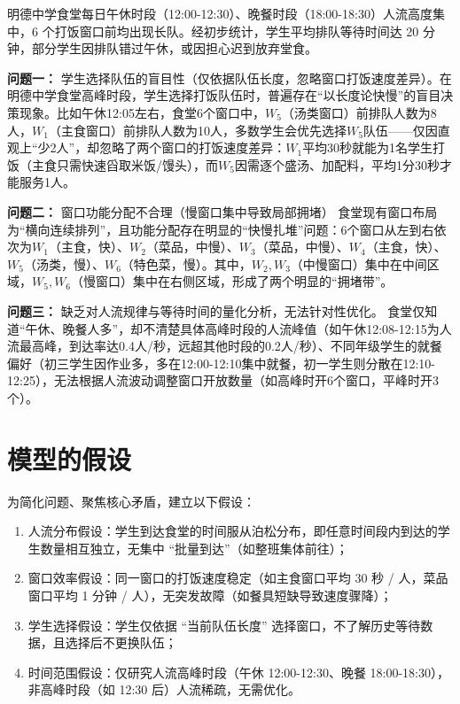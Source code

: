 \documentclass[bwprint]{gmcmthesis}
\begin{document}

\noindent 明德中学食堂每日午休时段（12:00-12:30）、晚餐时段（18:00-18:30）人流高度集中，6 个打饭窗口前均出现长队。经初步统计，学生平均排队等待时间达 20 分钟，部分学生因排队错过午休，或因担心迟到放弃堂食。

\textbf{问题一：} 学生选择队伍的盲目性（仅依据队伍长度，忽略窗口打饭速度差异）。在明德中学食堂高峰时段，学生选择打饭队伍时，普遍存在“以长度论快慢”的盲目决策现象。比如午休12:05左右，食堂6个窗口中，$W_5$（汤类窗口）前排队人数为8人，$W_1$（主食窗口）前排队人数为10人，多数学生会优先选择$W_5$队伍——仅因直观上“少2人”，却忽略了两个窗口的打饭速度差异：$W_1$平均30秒就能为1名学生打饭（主食只需快速舀取米饭/馒头），而$W_5$因需逐个盛汤、加配料，平均1分30秒才能服务1人。

\textbf{问题二：} 窗口功能分配不合理（慢窗口集中导致局部拥堵）
食堂现有窗口布局为“横向连续排列”，且功能分配存在明显的“快慢扎堆”问题：6个窗口从左到右依次为$W_1$（主食，快）、$W_2$（菜品，中慢）、$W_3$（菜品，中慢）、$W_4$（主食，快）、$W_5$（汤类，慢）、$W_6$（特色菜，慢）。其中，$W_2,W_3$（中慢窗口）集中在中间区域，$W_5,W_6$（慢窗口）集中在右侧区域，形成了两个明显的“拥堵带”。

\textbf{问题三：} 缺乏对人流规律与等待时间的量化分析，无法针对性优化。
食堂仅知道“午休、晚餐人多”，却不清楚具体高峰时段的人流峰值（如午休12:08-12:15为人流最高峰，到达率达0.4人/秒，远超其他时段的0.2人/秒）、不同年级学生的就餐偏好（初三学生因作业多，多在12:00-12:10集中就餐，初一学生则分散在12:10-12:25），无法根据人流波动调整窗口开放数量（如高峰时开6个窗口，平峰时开3个）。


\clearpage
\section{模型的假设}
为简化问题、聚焦核心矛盾，建立以下假设：
\begin{enumerate}
\item 人流分布假设：学生到达食堂的时间服从泊松分布，即任意时间段内到达的学生数量相互独立，无集中 “批量到达”（如整班集体前往）；
\item 窗口效率假设：同一窗口的打饭速度稳定（如主食窗口平均 30 秒 / 人，菜品窗口平均 1 分钟 / 人），无突发故障（如餐具短缺导致速度骤降）；
\item 学生选择假设：学生仅依据 “当前队伍长度” 选择窗口，不了解历史等待数据，且选择后不更换队伍；
\item 时间范围假设：仅研究人流高峰时段（午休 12:00-12:30、晚餐 18:00-18:30），非高峰时段（如 12:30 后）人流稀疏，无需优化。
\end{enumerate}
\end{document}

